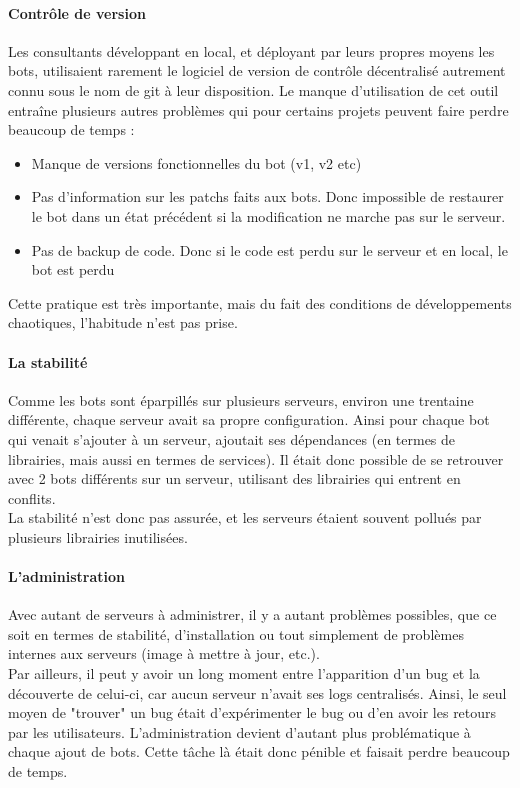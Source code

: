 \documentclass{article} %
\begin{document}
{\paragraph{Contrôle de version}
Les consultants développant en local, et déployant par leurs propres moyens les bots,  utilisaient rarement le logiciel de version de contrôle décentralisé autrement connu sous le nom de git à leur disposition.
Le manque d'utilisation de cet outil entraîne plusieurs autres problèmes qui pour certains projets peuvent faire perdre beaucoup de temps :
\begin{itemize}
 \item Manque de versions fonctionnelles du bot (v1, v2 etc)
 \item Pas d'information sur les patchs faits aux bots. Donc impossible de restaurer le bot dans un état précédent si la modification ne marche pas sur le serveur.
 \item Pas de backup de code. Donc si le code est perdu sur le serveur et en local, le bot est perdu
\end{itemize}
Cette pratique est très importante, mais du fait des conditions de développements chaotiques, l'habitude n'est pas prise.

\paragraph{La stabilité}
Comme les bots sont éparpillés sur plusieurs serveurs, environ une trentaine différente, chaque serveur avait sa propre configuration. Ainsi pour chaque bot qui venait s'ajouter à un serveur, ajoutait ses dépendances (en termes de librairies, mais aussi en termes de services). Il était donc possible de se retrouver avec 2 bots différents sur un serveur, utilisant des librairies qui entrent en conflits.\\
La stabilité n'est donc pas assurée, et les serveurs étaient souvent pollués par plusieurs librairies inutilisées.

\paragraph{L'administration}
Avec autant de serveurs à administrer, il y a autant problèmes possibles, que ce soit en termes de stabilité, d'installation ou tout simplement de problèmes internes aux serveurs (image à mettre à jour, etc.).\\
Par ailleurs, il peut y avoir un long moment entre l'apparition d'un bug et la découverte de celui-ci, car aucun serveur n'avait ses logs centralisés. Ainsi, le seul moyen de "trouver" un bug était d'expérimenter le bug ou d'en avoir les retours par les utilisateurs. L'administration devient d'autant plus problématique à chaque ajout de bots. Cette tâche là était donc pénible et faisait perdre beaucoup de temps.

}
\end{document}
